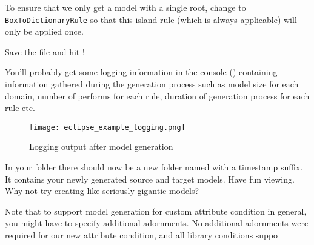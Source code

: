 \begin{stepbystep}

\item  To ensure that we only get a model with a single root, change  to \texttt{BoxToDictionaryRule} so that this island rule (which is always applicable) will only be applied once.

\item Save the file and hit !

You'll probably get some logging information in the console () containing information gathered during the generation process such as model size for each domain, number of performs for each rule, duration of generation process for each rule etc.

\end{stepbystep}


\begin{figure}[htbp]
\renewcommand\figurename{Figure} 
\begin{center}
\texttt{[image: eclipse\_example\_logging.png]}
\caption{Logging output after model generation}
\label{eclipse:modelgen_log}
\end{center}
\end{figure}

In your  folder there should now be a new folder named  with a timestamp suffix. 
It contains your newly generated source and target models.
Have fun viewing.
Why not try creating like seriously gigantic models?

Note that to support model generation for custom attribute condition in general, you might have to specify additional  adornments. 
No additional adornments were required for our new attribute condition, and all library conditions suppo

